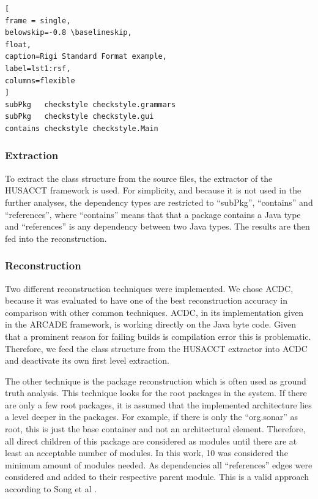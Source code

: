 \documentclass[conference]{IEEEtran}
\begin{document}
\begin{lstlisting}[
frame = single, 
belowskip=-0.8 \baselineskip,
float,
caption=Rigi Standard Format example,
label=lst1:rsf,
columns=flexible
]
subPkg   checkstyle checkstyle.grammars
subPkg   checkstyle checkstyle.gui
contains checkstyle checkstyle.Main
\end{lstlisting}



\subsubsection{Extraction}

To extract the class structure from the source files, the extractor of the HUSACCT framework is used. For simplicity, and because it is not used in the further analyses, the dependency types are restricted to ``subPkg'', ``contains'' and ``references'', where ``contains'' means that that a package contains a Java type and ``references'' is any dependency between two Java types. The results are then fed into the reconstruction.

\subsubsection{Reconstruction}

Two different reconstruction techniques were implemented. We chose ACDC, because it was evaluated to have one of the best reconstruction accuracy \cite{arcRec-comparison} in comparison with other common techniques. ACDC, in its implementation given in the ARCADE framework, is working directly on the Java byte code. Given that a prominent reason for failing builds is compilation error this is problematic. Therefore, we feed the class structure from the HUSACCT extractor into ACDC and deactivate its own first level extraction.

The other technique is the package reconstruction which is often used as ground truth analysis.
This technique looks for the root packages in the system. If there are only a few root packages, it is assumed that the implemented architecture lies a level deeper in the packages. For example, if there is only the ``org.sonar'' as root, this is just the base container and not an architectural element. Therefore, all direct children of this package are considered as modules until there are at least an acceptable number of modules. In this work, 10 was considered the minimum amount of modules needed. As dependencies all ``references'' edges were considered and added to their respective parent module. This is a valid approach according to Song et al \cite{ArcAsGraph}. 
\end{document}
